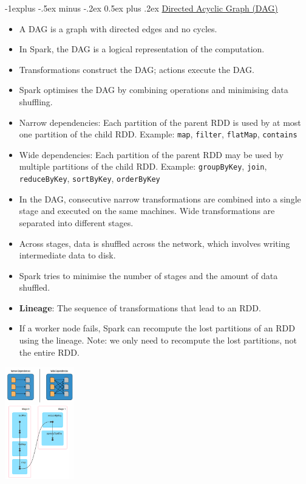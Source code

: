 \documentclass[10pt, landscape]{article}
\makeatletter
\renewcommand{\subsection}{\@startsection{subsection}{2}{0mm}%
  {-1explus -.5ex minus -.2ex}%
  {0.5ex plus .2ex}%
{\normalfont\normalsize\bfseries}}
\makeatother
\begin{document}
\begin{multicols*}{4}
  \subsection{\underline{Directed Acyclic Graph (DAG)}}
  \begin{itemize}
    \item A DAG is a graph with directed edges and no cycles.
    \item In Spark, the DAG is a logical representation of the computation.
    \item Transformations construct the DAG; actions execute the DAG.
    \item Spark optimises the DAG by combining operations and minimising data shuffling.
    \item Narrow dependencies: Each partition of the parent RDD is used by at most one partition of the child RDD. Example: \texttt{map}, \texttt{filter}, \texttt{flatMap}, \texttt{contains}
    \item Wide dependencies: Each partition of the parent RDD may be used by multiple partitions of the child RDD. Example: \texttt{groupByKey}, \texttt{join}, \texttt{reduceByKey}, \texttt{sortByKey}, \texttt{orderByKey} 
    \item In the DAG, consecutive narrow transformations are combined into a single stage and executed on the same machines. Wide transformations are separated into different stages.
    \item Across stages, data is shuffled across the network, which involves writing intermediate data to disk.
    \item Spark tries to minimise the number of stages and the amount of data shuffled.
    \item \textbf{Lineage}: The sequence of transformations that lead to an RDD.
    \item If a worker node fails, Spark can recompute the lost partitions of an RDD using the lineage. Note: we only need to recompute the lost partitions, not the entire RDD.
  \end{itemize}

  \includegraphics[width=0.95\linewidth, height=185px]{spark_dependency_stages.png}


\end{multicols*}
\end{document}
